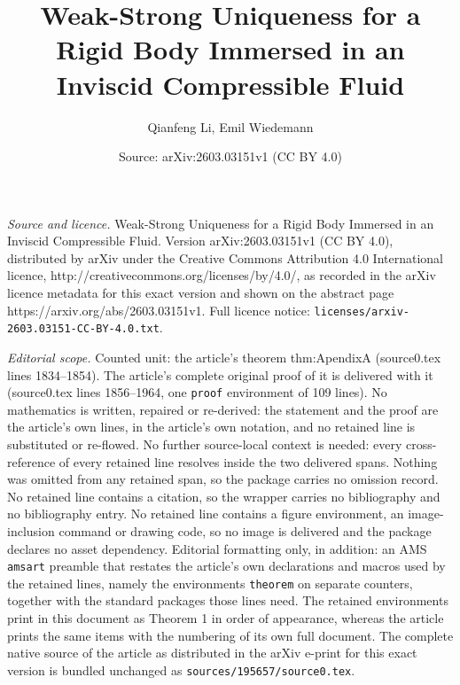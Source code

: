 \documentclass[10pt,a4paper]{amsart}
\title{Weak-Strong Uniqueness for a Rigid Body Immersed in an Inviscid Compressible Fluid}
\author{Qianfeng Li, Emil Wiedemann}
\date{Source: arXiv:2603.03151v1 (CC BY 4.0)}
\begin{document}
\maketitle

\noindent\emph{Source and licence.} Weak-Strong Uniqueness for a Rigid Body Immersed in an Inviscid Compressible Fluid. Version arXiv:2603.03151v1 (CC BY 4.0), distributed by arXiv under the Creative Commons Attribution 4.0 International licence, http://creativecommons.org/licenses/by/4.0/, as recorded in the arXiv licence metadata for this exact version and shown on the abstract page https://arxiv.org/abs/2603.03151v1. Full licence notice: \texttt{licenses/arxiv-2603.03151-CC-BY-4.0.txt}.\par\smallskip

\noindent\textit{Editorial scope.} Counted unit: the article's theorem thm:ApendixA (source0.tex lines 1834--1854). The article's complete original proof of it is delivered with it (source0.tex lines 1856--1964, one \texttt{proof} environment of 109 lines). No mathematics is written, repaired or re-derived: the statement and the proof are the article's own lines, in the article's own notation, and no retained line is substituted or re-flowed.  No further source-local context is needed: every cross-reference of every retained line resolves inside the two delivered spans.  Nothing was omitted from any retained span, so the package carries no omission record.  No retained line contains a citation, so the wrapper carries no bibliography and no bibliography entry.  No retained line contains a figure environment, an image-inclusion command or drawing code, so no image is delivered and the package declares no asset dependency.  Editorial formatting only, in addition: an AMS \texttt{amsart} preamble that restates the article's own declarations and macros used by the retained lines, namely the environments \texttt{theorem} on separate counters, together with the standard packages those lines need.  The retained environments print in this document as Theorem 1 in order of appearance, whereas the article prints the same items with the numbering of its own full document.  The complete native source of the article as distributed in the arXiv e-print for this exact version is bundled unchanged as \texttt{sources/195657/source0.tex}.
\end{document}
